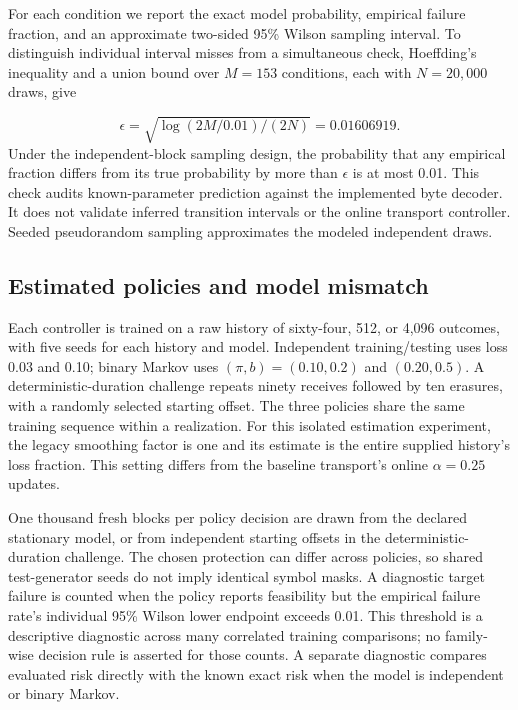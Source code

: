 \documentclass[11pt,a4paper]{article}
\begin{document}
For each condition we report the exact model probability, empirical failure fraction, and an approximate two-sided 95\% Wilson sampling interval. To distinguish individual interval misses from a simultaneous check, Hoeffding's inequality and a union bound over $M=153$ conditions, each with $N=20,000$ draws, give

\[
\epsilon=\sqrt{\log(2M/0.01)/(2N)}=0.01606919. \tag{7}
\]
Under the independent-block sampling design, the probability that any empirical fraction differs from its true probability by more than $\epsilon$ is at most 0.01. This check audits known-parameter prediction against the implemented byte decoder. It does not validate inferred transition intervals or the online transport controller. Seeded pseudorandom sampling approximates the modeled independent draws.

\subsection{Estimated policies and model mismatch}
Each controller is trained on a raw history of sixty-four, 512, or 4,096 outcomes, with five seeds for each history and model. Independent training/testing uses loss 0.03 and 0.10; binary Markov uses $(\pi,b)=(0.10,0.2)$ and $(0.20,0.5)$. A deterministic-duration challenge repeats ninety receives followed by ten erasures, with a randomly selected starting offset. The three policies share the same training sequence within a realization. For this isolated estimation experiment, the legacy smoothing factor is one and its estimate is the entire supplied history's loss fraction. This setting differs from the baseline transport's online $\alpha=0.25$ updates.

One thousand fresh blocks per policy decision are drawn from the declared stationary model, or from independent starting offsets in the deterministic-duration challenge. The chosen protection can differ across policies, so shared test-generator seeds do not imply identical symbol masks. A diagnostic target failure is counted when the policy reports feasibility but the empirical failure rate's individual 95\% Wilson lower endpoint exceeds 0.01. This threshold is a descriptive diagnostic across many correlated training comparisons; no family-wise decision rule is asserted for those counts. A separate diagnostic compares evaluated risk directly with the known exact risk when the model is independent or binary Markov.
\end{document}
